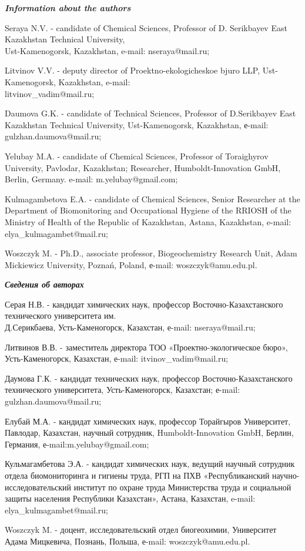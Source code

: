 \begin{info}
\emph{{\bfseries Information about the authors}}

Seraya N.V. - candidate of Chemical Sciences, Professor of D. Serikbayev
East Kazakhstan Technical University, \\Ust-Kamenogorsk,
Kazakhstan, e-mail:
nseraya@mail.ru;

Litvinov V.V. - deputy director of Proektno-ekologicheskoe bjuro LLP,
Ust-Kamenogorsk, Kazakhstan, e-mail:\\
litvinov\_vadim@mail.ru;

Daumova G.K. - candidate of Technical Sciences, Professor of
D.Serikbayev East Kazakhstan Technical University,
Ust-Kamenogorsk, Kazakhstan, е-mail:
gulzhan.daumova@mail.ru;

Yelubay M.A. - candidate of Chemical Sciences, Professor of Toraighyrov
University, Pavlodar, Kazakhstan; Researcher, Humboldt-Innovation GmbH,
Berlin, Germany. e-mail: m.yelubay@gmail.com;

Kulmagambetova E.A. - candidate of Chemical Sciences, Senior Researcher
at the Department of Biomonitoring and Occupa\-tional Hygiene of the
RRIOSH of the Ministry of Health of the Republic of Kazakhstan, Astana,
Kazakhstan, e-mail:\\
elya\_kulmagambet@mail.ru;

Woszczyk M. - Ph.D., associate professor, Biogeochemistry Research Unit,
Adam Mickiewicz University, Poznań, Poland, е-mail:
woszczyk@amu.edu.pl.

\emph{{\bfseries Сведения об авторах}}

Серая Н.В. - кандидат химических наук, профессор Восточно-Казахстанского
технического университета им. \\Д.Серикбаева, Усть-Каменогорск, Казахстан,
е-mail: nseraya@mail.ru;

Литвинов В.В. - заместитель директора ТОО «Проектно-экологическое бюро»,
Усть-Каменогорск, Казахстан, е-mail:
itvinov\_vadim@mail.ru;

Даумова Г.К. - кандидат технических наук, профессор
Восточно-Казахстанского технического университета, Усть-Каменогорск,
Казахстан; е-mail:
gulzhan.daumova@mail.ru;

Елубай М.А. - кандидат химических наук, профессор Торайгыров
Университет, Павлодар, Казахстан, научный сотрудник, Humboldt-Innovation
GmbH, Берлин, Германия, е-mail:m.yelubay@gmail.com;

Кульмагамбетова Э.А. - кандидат химических наук, ведущий научный
сотрудник отдела биомониторинга и гигиены труда, РГП на ПХВ
«Республиканский научно-исследовательский институт по охране труда
Министерства труда и социальной защиты населения Республики Казахстан»,
Астана, Казахстан, e-mail:
elya\_kulmagambet@mail.ru;

Woszczyk M. - доцент, исследовательский отдел биогеохимии, Университет
Адама Мицкевича, Познань, Польша, е-mail:
woszczyk@amu.edu.pl.
\end{info}
